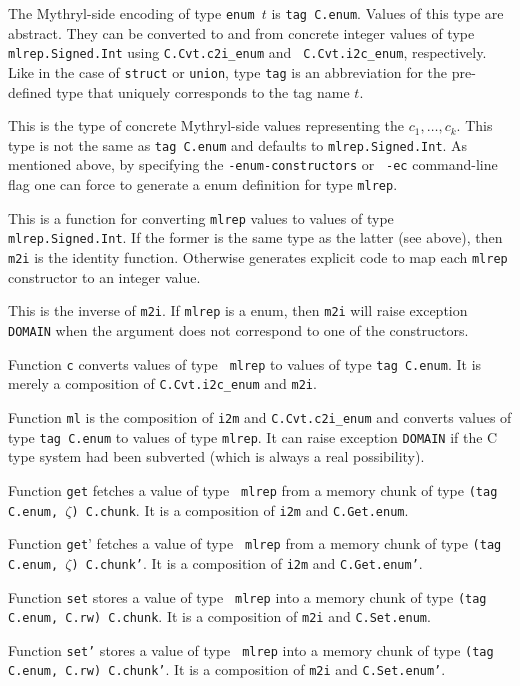 \begin{description}\setlength{\itemsep}{0pt}
\item[{\tt type tag}] The Mythryl-side encoding of type {\tt enum $t$} is
  {\tt tag C.enum}.  Values of this type are abstract.  They can be
  converted to and from concrete integer values of type {\tt
    mlrep.Signed.Int} using {\tt C.Cvt.c2i\_enum} and {\tt
    C.Cvt.i2c\_enum}, respectively.  Like in the case of {\tt struct}
  or {\tt union}, type {\tt tag} is an abbreviation for the
  pre-defined type that uniquely corresponds to the tag name $t$.
\item[{\tt type mlrep}] This is the type of concrete Mythryl-side values
  representing the $c_1,\ldots,c_k$.  This type is not the same as
  {\tt tag C.enum} and defaults to {\tt mlrep.Signed.Int}.  As
  mentioned above, by specifying the {\tt -enum-constructors} or {\tt
    -ec} command-line flag one can force {\cgluemaker} to generate a
  enum definition for type {\tt mlrep}.
\item[{\tt my m2i}] This is a function for converting {\tt mlrep}
  values to values of type {\tt mlrep.Signed.Int}.  If the former is
  the same type as the latter (see above), then {\tt m2i} is the
  identity function.  Otherwise {\cgluemaker} generates explicit code to
  map each {\tt mlrep} constructor to an integer value.
\item[{\tt my i2m}] This is the inverse of {\tt m2i}.  If {\tt mlrep}
  is a enum, then {\tt m2i} will raise exception {\tt DOMAIN} when
  the argument does not correspond to one of the constructors.
\item[{\tt my c}] Function {\tt c} converts values of type {\tt
    mlrep} to values of type {\tt tag C.enum}.  It is merely a
  composition of {\tt C.Cvt.i2c\_enum} and {\tt m2i}.
\item[{\tt my ml}] Function {\tt ml} is the composition of {\tt i2m}
  and {\tt C.Cvt.c2i\_enum} and converts values of type {\tt tag
    C.enum} to values of type {\tt mlrep}.  It can raise exception
  {\tt DOMAIN} if the C type system had been subverted (which is
  always a real possibility).
\item[{\tt my get}] Function {\tt get} fetches a value of type {\tt
    mlrep} from a memory chunk of type {\tt (tag C.enum, $\zeta$)
    C.chunk}.  It is a composition of {\tt i2m} and {\tt C.Get.enum}.
\item[{\tt my get'}] Function {\tt get}' fetches a value of type {\tt
    mlrep} from a memory chunk of type {\tt (tag C.enum, $\zeta$)
    C.chunk'}.  It is a composition of {\tt i2m} and {\tt C.Get.enum'}.
\item[{\tt my set}] Function {\tt set} stores a value of type {\tt
    mlrep} into a memory chunk of type {\tt (tag C.enum, C.rw)
    C.chunk}.  It is a composition of {\tt m2i} and {\tt C.Set.enum}.
\item[{\tt my set'}] Function {\tt set'} stores a value of type {\tt
    mlrep} into a memory chunk of type {\tt (tag C.enum, C.rw)
    C.chunk'}.  It is a composition of {\tt m2i} and {\tt C.Set.enum'}.
\end{description}

